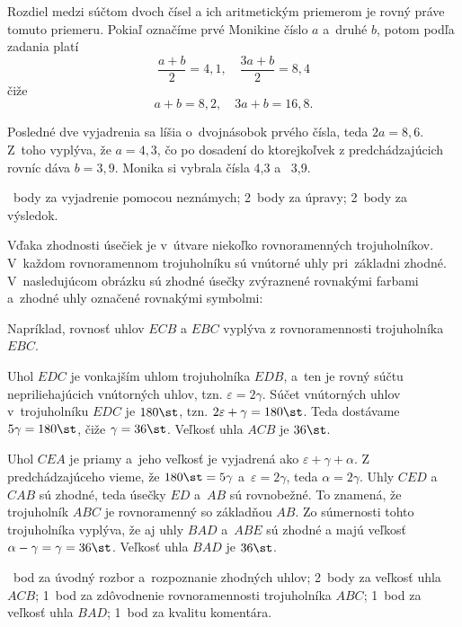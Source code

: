 {%
Rozdiel medzi súčtom dvoch čísel a ich aritmetickým priemerom je rovný práve tomuto priemeru.
Pokiaľ označíme prvé Monikine číslo $a$ a~druhé $b$, potom podľa zadania platí
$$
\frac{a+b}{2}=4{,}1, \quad \frac{3a+b}{2}=8{,}4
$$
čiže
$$
a+b=8{,}2, \quad 3a+b=16{,}8.
$$

Posledné dve vyjadrenia sa líšia o~dvojnásobok prvého čísla, teda $2a =8{,}6$.
Z~toho vyplýva, že $a=4{,}3$, čo po dosadení do ktorejkoľvek z predchádzajúcich rovníc dáva $b=3{,}9$.
Monika si vybrala čísla 4,3 a ~3,9.

~body za vyjadrenie pomocou neznámych;
2~body za úpravy;
2~body za výsledok.
\endhodnotenie
}

{%
Vďaka zhodnosti úsečiek je v~útvare niekoľko rovnoramenných trojuholníkov.
V~každom rovnoramennom trojuholníku sú vnútorné uhly pri~základni zhodné.
V~nasledujúcom obrázku sú zhodné úsečky zvýraznené rovnakými farbami a~zhodné uhly označené rovnakými symbolmi:
%

Napríklad, rovnosť uhlov $ECB$ a $EBC$ vyplýva z rovnoramennosti trojuholníka $EBC$. 

Uhol $EDC$ je vonkajším uhlom trojuholníka $EDB$, a~ten je rovný súčtu nepriliehajúcich vnútorných uhlov, tzn. $\varepsilon=2\gamma$.
Súčet vnútorných uhlov v~trojuholníku $EDC$ je $180\st$, tzn.
$2\varepsilon+\gamma = 180\st$.
Teda dostávame $5\gamma=180\st$, čiže $\gamma=36\st$.
Veľkosť uhla $ACB$ je $36\st$.

Uhol $CEA$ je priamy a~jeho veľkosť je vyjadrená ako $\varepsilon+\gamma+\alpha$.
Z predchádzajúceho vieme, že $180\st=5\gamma$ a~$\varepsilon=2\gamma$, teda $\alpha=2\gamma$.
Uhly $CED$ a~$CAB$ sú zhodné, teda úsečky $ED$ a~$AB$ sú rovnobežné.
To znamená, že trojuholník $ABC$ je rovnoramenný so základňou $AB$.
Zo súmernosti tohto trojuholníka vyplýva, že aj uhly $BAD$ a~$ABE$ sú zhodné a majú veľkosť $\alpha-\gamma=\gamma=36\st$.
Veľkosť uhla $BAD$ je $36\st$.
%

~bod za úvodný rozbor a~rozpoznanie zhodných uhlov;
2~body za veľkosť uhla $ACB$;
1~bod za zdôvodnenie rovnoramennosti trojuholníka $ABC$;
1~bod za veľkosť uhla $BAD$;
1~bod za kvalitu komentára.
\endhodnotenie
}

